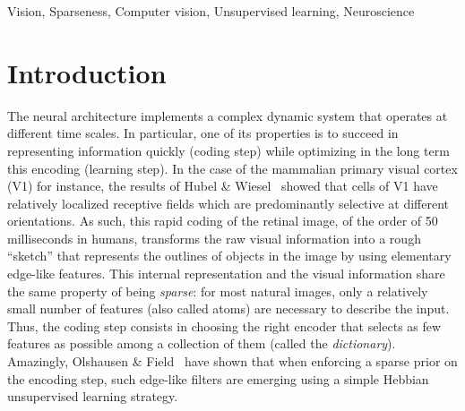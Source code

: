 \documentclass[letterpaper,final,conference,10pt]{IEEEtran}
\newcommand{\Abstract}{ %
The formation of structure in the brain, that is, of the connections between cells within neural populations, is by large an unsupervised learning process: the emergence of this architecture is mostly self-organized. In the primary visual cortex of mammals, for example, one may observe during development the formation of cells selective to localized, oriented features. This leads to the development of a rough representation of contours of the retinal image in area V1. We modeled these mechanisms using sparse Hebbian learning algorithms. These algorithms alternate a coding step to encode the information with a learning step to find the proper encoder. A major difficulty is to deduce a good representation while knowing immature encoders, and to learn good encoders with a non-optimal representation. To address this problem, we propose to introduce a new regulation process between learning and coding, called homeostasis. It is compatible with a neuro-mimetic architecture and allows for the fast emergence of localized filters sensitive to orientation. The key to this algorithm lies in a simple adaptation mechanism based on non-linear functions that reconciles the antagonistic processes that occur at the coding and learning time scales. We tested this unsupervised algorithm with this homeostasis rule for a range of learning algorithms coupled with different neural coding algorithms. In addition, we propose a simplification of this optimal homeostasis rule by implementing a simple heuristic on the probability of activation of neurons. Compared to the optimal homeostasis rule, we show that this heuristic allows to implement a more rapid unsupervised learning algorithm while keeping a large part of its effectiveness. These results demonstrate the potential application of such a strategy in machine learning and we illustrate this with one result in a convolutional neural network.
}
\newcommand{\Keywords}{Vision, Sparseness, Computer vision, Unsupervised learning, Neuroscience}%
\begin{document}
%
\maketitle
\begin{abstract}
\Abstract
\end{abstract}
%
%

\begin{IEEEkeywords}
\Keywords
\end{IEEEkeywords}
\section{Introduction}\label{introduction}
The neural architecture implements a complex dynamic system that operates at different time scales. In particular, one of its properties is to succeed in representing information quickly (coding step) while optimizing in the long term this encoding (learning step). In the case of the mammalian primary visual cortex (V1) for instance, the results of Hubel \& Wiesel~\cite{Hubel68} showed that cells of V1 have relatively localized receptive fields which are predominantly selective at different orientations. As such, this rapid coding of the retinal image, of the order of 50 milliseconds in humans, transforms the raw visual information into a rough ``sketch'' that represents the outlines of objects in the image by using elementary edge-like features. This internal representation and the visual information share the same property of being \emph{sparse}: for most natural images, only a relatively small number of features (also called atoms) are necessary to describe the input. Thus, the coding step consists in choosing the right encoder that selects as few features as possible among a collection of them (called the \emph{dictionary}). Amazingly, Olshausen \& Field~\cite{Olshausen96} have shown that when enforcing a sparse prior on the encoding step, such edge-like filters are emerging using a simple Hebbian unsupervised learning strategy. %
\end{document}
